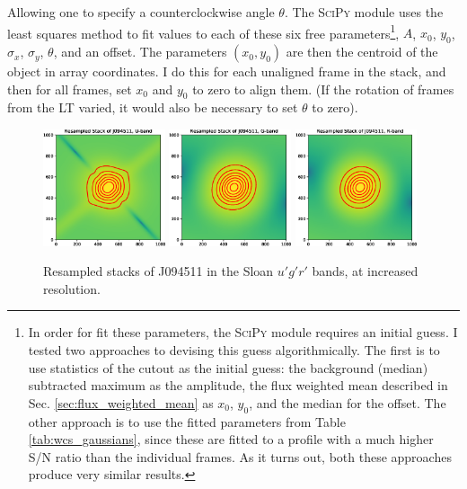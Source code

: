 \documentclass[a4paper,11pt]{article}
\begin{document}
Allowing one to specify a counterclockwise angle $\theta$.\cite{astropy_gaussian} The \textsc{SciPy} module uses the least squares method to fit values to each of these six free parameters\footnote{In order for fit these parameters, the \textsc{SciPy} module requires an initial guess.\cite{scipy_module_2020} I tested two approaches to devising this guess algorithmically. The first is to use statistics of the cutout as the initial guess: the background (median) subtracted maximum as the amplitude, the flux weighted mean described in Sec. \ref{sec:flux_weighted_mean} as $x_0$, $y_0$, and the median for the offset. The other approach is to use the fitted parameters from Table \ref{tab:wcs_gaussians}, since these are fitted to a profile with a much higher S/N ratio than the individual frames. As it turns out, both these approaches produce very similar results.}, $A$, $x_0$, $y_0$, $\sigma_x$, $\sigma_y$, $\theta$, and an offset.\cite{scipy_module_2020} The parameters $(x_0, y_0)$ are then the centroid of the object in array coordinates. I do this for each unaligned frame in the stack, and then for all frames, set $x_0$ and $y_0$ to zero to align them. (If the rotation of frames from the LT varied, it would also be necessary to set $\theta$ to zero).

\begin{figure}[h!]
    \includegraphics[width=0.32\textwidth]{J094511_U_resampled_stack.eps}
    \includegraphics[width=0.32\textwidth]{J094511_G_resampled_stack.eps}
    \includegraphics[width=0.32\textwidth]{J094511_R_resampled_stack.eps}
    \caption{Resampled stacks of J094511 in the Sloan $u'g'r'$ bands, at increased resolution.}
    \label{fig:resampled_stacks}
\end{figure}
\end{document}
